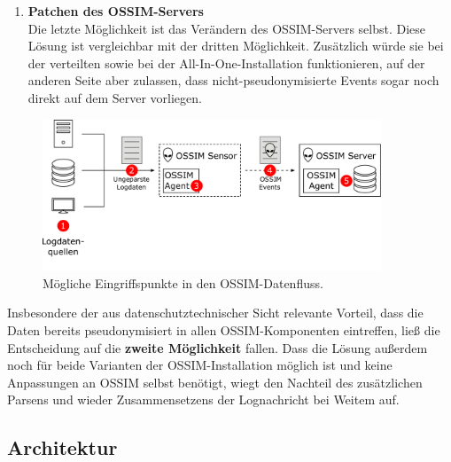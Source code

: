 \begin{enumerate}
\item \textbf{Patchen des OSSIM-Servers}\\
  Die letzte Möglichkeit ist das Verändern des OSSIM-Servers selbst. Diese Lösung ist vergleichbar mit der dritten Möglichkeit. Zusätzlich würde sie bei der verteilten sowie bei der All-In-One-Installation funktionieren, auf der anderen Seite aber zulassen, dass nicht-pseudonymisierte Events sogar noch direkt auf dem Server vorliegen.

\end{enumerate}

\begin{figure}[]
    \centering
        \includegraphics[width=0.9\textwidth]{dia/ossim_data_access_point.pdf}
    \caption{Mögliche Eingriffspunkte in den OSSIM-Datenfluss.}
    \label{fig:ossim_data_access_point}
\end{figure}

Insbesondere der aus datenschutztechnischer Sicht relevante Vorteil, dass die Daten bereits pseudonymisiert in allen OSSIM-Komponenten eintreffen, ließ die Entscheidung auf die \textbf{zweite Möglichkeit} fallen. 
Dass die Lösung außerdem noch für beide Varianten der OSSIM-Installation möglich ist und keine Anpassungen an OSSIM selbst benötigt, wiegt den Nachteil des zusätzlichen Parsens und wieder Zusammensetzens der Lognachricht bei Weitem auf.



\subsection{Architektur}

%

